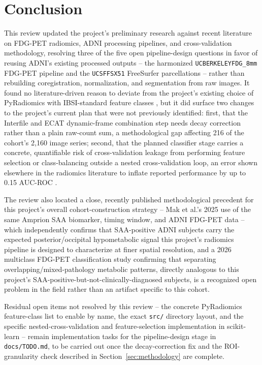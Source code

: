 \section{Conclusion}
\label{sec:conclusion}

This review updated the project's preliminary research against recent literature on FDG-PET radiomics, ADNI processing pipelines, and cross-validation methodology, resolving three of the five open pipeline-design questions in favor of reusing ADNI's existing processed outputs -- the harmonized \texttt{UCBERKELEYFDG\_8mm} FDG-PET pipeline \cite{jagust2024petcore,jagust2010petcore} and the \texttt{UCSFFSX51} FreeSurfer parcellations -- rather than rebuilding coregistration, normalization, and segmentation from raw images. It found no literature-driven reason to deviate from the project's existing choice of PyRadiomics with IBSI-standard feature classes \cite{vangriethuysen2017pyradiomics,zwanenburg2020ibsi}, but it did surface two changes to the project's current plan that were not previously identified: first, that the Interfile and ECAT dynamic-frame combination step needs decay correction rather than a plain raw-count sum, a methodological gap affecting 216 of the cohort's 2{,}160 image series; second, that the planned classifier stage carries a concrete, quantifiable risk of cross-validation leakage from performing feature selection or class-balancing outside a nested cross-validation loop, an error shown elsewhere in the radiomics literature to inflate reported performance by up to 0.15 AUC-ROC \cite{demircioglu2021bias,demircioglu2024oversampling}.

The review also located a close, recently published methodological precedent for this project's overall cohort-construction strategy -- Mak et al.'s 2025 use of the same Amprion SAA biomarker, timing window, and ADNI FDG-PET data \cite{mak2025alphasynuclein} -- which independently confirms that SAA-positive ADNI subjects carry the expected posterior/occipital hypometabolic signal this project's radiomics pipeline is designed to characterize at finer spatial resolution, and a 2026 multiclass FDG-PET classification study \cite{kim2026dlfdgpet} confirming that separating overlapping/mixed-pathology metabolic patterns, directly analogous to this project's SAA-positive-but-not-clinically-diagnosed subjects, is a recognized open problem in the field rather than an artifact specific to this cohort.

Residual open items not resolved by this review -- the concrete PyRadiomics feature-class list to enable by name, the exact \texttt{src/} directory layout, and the specific nested-cross-validation and feature-selection implementation in scikit-learn -- remain implementation tasks for the pipeline-design stage in \texttt{docs/TODO.md}, to be carried out once the decay-correction fix and the ROI-granularity check described in Section~\ref{sec:methodology} are complete.
